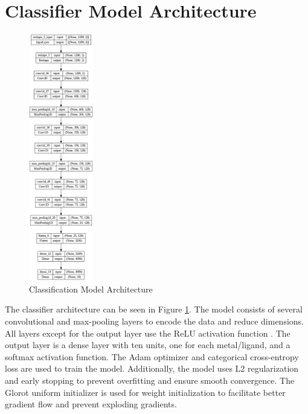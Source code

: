 \section{Classifier Model Architecture}
\begin{figure}[!h]
  \centering
    \includegraphics[width=0.25\textwidth]{figures/model_architecture.png}
    \caption{Classification Model Architecture}
    \label{model_arch}
\end{figure}
The classifier architecture can be seen in Figure \ref{model_arch}. The model consists of several convolutional and max-pooling layers to encode the data and reduce dimensions. All layers except for the output layer use the ReLU activation function \cite{Fukushima1969}. The output layer is a dense layer with ten units, one for each metal/ligand, and a softmax activation function. The Adam optimizer \cite{https://doi.org/10.48550/arxiv.1412.6980} and categorical cross-entropy loss are used to train the model. Additionally, the model uses L2 regularization and early stopping to prevent overfitting and ensure smooth convergence. The Glorot uniform initializer \cite{pmlr-v9-glorot10a} is used for weight initialization to facilitate better gradient flow and prevent exploding gradients. 
